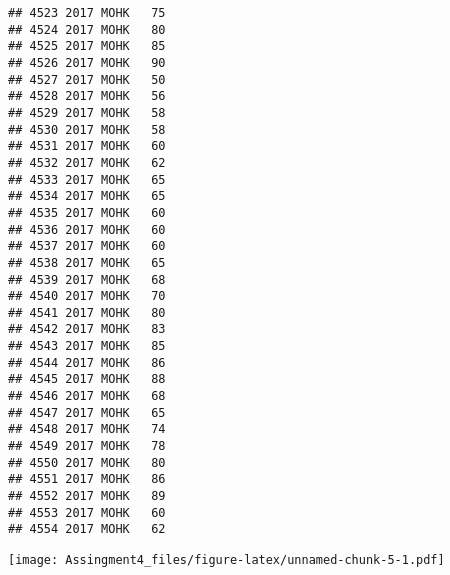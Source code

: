 \documentclass[]{article}
\newenvironment{Shaded}{\begin{snugshade}}{\end{snugshade}}
\newcommand{\KeywordTok}[1]{\textcolor[rgb]{0.13,0.29,0.53}{\textbf{#1}}}
\newcommand{\DataTypeTok}[1]{\textcolor[rgb]{0.13,0.29,0.53}{#1}}
\newcommand{\DecValTok}[1]{\textcolor[rgb]{0.00,0.00,0.81}{#1}}
\newcommand{\StringTok}[1]{\textcolor[rgb]{0.31,0.60,0.02}{#1}}
\newcommand{\CommentTok}[1]{\textcolor[rgb]{0.56,0.35,0.01}{\textit{#1}}}
\newcommand{\OperatorTok}[1]{\textcolor[rgb]{0.81,0.36,0.00}{\textbf{#1}}}
\newcommand{\NormalTok}[1]{#1}
\begin{document}
\begin{verbatim}
## 4523 2017 MOHK   75
## 4524 2017 MOHK   80
## 4525 2017 MOHK   85
## 4526 2017 MOHK   90
## 4527 2017 MOHK   50
## 4528 2017 MOHK   56
## 4529 2017 MOHK   58
## 4530 2017 MOHK   58
## 4531 2017 MOHK   60
## 4532 2017 MOHK   62
## 4533 2017 MOHK   65
## 4534 2017 MOHK   65
## 4535 2017 MOHK   60
## 4536 2017 MOHK   60
## 4537 2017 MOHK   60
## 4538 2017 MOHK   65
## 4539 2017 MOHK   68
## 4540 2017 MOHK   70
## 4541 2017 MOHK   80
## 4542 2017 MOHK   83
## 4543 2017 MOHK   85
## 4544 2017 MOHK   86
## 4545 2017 MOHK   88
## 4546 2017 MOHK   68
## 4547 2017 MOHK   65
## 4548 2017 MOHK   74
## 4549 2017 MOHK   78
## 4550 2017 MOHK   80
## 4551 2017 MOHK   86
## 4552 2017 MOHK   89
## 4553 2017 MOHK   60
## 4554 2017 MOHK   62
\end{verbatim}

\begin{Shaded}
\end{Shaded}

\texttt{[image: Assingment4\_files/figure-latex/unnamed-chunk-5-1.pdf]}
\end{document}
